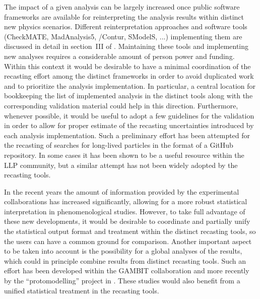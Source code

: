 \documentclass[11pt]{article}
\begin{document}
The impact of a given analysis can be largely increased once public software frameworks are available for reinterpreting the analysis results within distinct new physics scenarios.
Different reinterpretation approaches and software tools (CheckMATE, MadAnalysis5, \rivet/Contur, SModelS, ...) implementing them are discussed in detail in section~III of \cite{LHCReinterpretationForum:2020xtr}.
Maintaining these tools and implementing new analyses requires a considerable amount of person power and funding.
Within this context it would be desirable to have a minimal coordination of the recasting effort among the distinct frameworks in order to avoid duplicated work and to prioritize the analysis implementation.
In particular, a central location for bookkeeping the list of implemented analysis in the distinct tools along with the corresponding validation material could help in this direction.
Furthermore, whenever possible, it would be useful to adopt a few guidelines for the validation in order to allow for proper estimate of the recasting uncertainties introduced by each analysis implementation.
Such a preliminary effort has been attempted for the recasting of searches for long-lived particles in the format of a GitHub repository\cite{llpRepo}.
In some cases it has been shown to be a useful resource within the LLP community, but a similar attempt has not been widely adopted by the recasting tools.

In the recent years the amount of information provided by the experimental collaborations has increased significantly, allowing for a more robust statistical interpretation in phenomenological studies. However, to take full advantage of these new developments, it would be desirable to coordinate and partially unify the statistical output format and treatment within the distinct recasting tools, so the users can have a common ground for comparison. Another important aspect to be taken into account is the possibility for a global analyses of the results, which could in principle combine results from distinct recasting tools. Such an effort has been developed within the GAMBIT collaboration \cite{Kvellestad:2019vxm} and more recently by the ``protomodelling'' project in \cite{Waltenberger:2020ygp}.
These studies would also benefit from a unified statistical treatment in the recasting tools.
\end{document}
